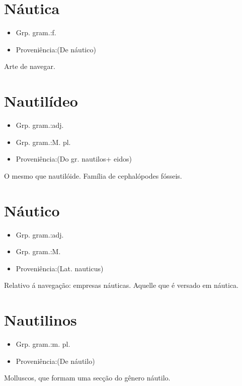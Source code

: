 \section{Náutica}
\begin{itemize}
\item {Grp. gram.:f.}
\end{itemize}
\begin{itemize}
\item {Proveniência:(De \textunderscore náutico\textunderscore )}
\end{itemize}
Arte de navegar.
\section{Nautilídeo}
\begin{itemize}
\item {Grp. gram.:adj.}
\end{itemize}
\begin{itemize}
\item {Grp. gram.:M. pl.}
\end{itemize}
\begin{itemize}
\item {Proveniência:(Do gr. \textunderscore nautilos\textunderscore  + \textunderscore eidos\textunderscore )}
\end{itemize}
O mesmo que \textunderscore nautilóide\textunderscore .
Família de cephalópodes fósseis.
\section{Náutico}
\begin{itemize}
\item {Grp. gram.:adj.}
\end{itemize}
\begin{itemize}
\item {Grp. gram.:M.}
\end{itemize}
\begin{itemize}
\item {Proveniência:(Lat. \textunderscore nauticus\textunderscore )}
\end{itemize}
Relativo á navegação: \textunderscore empresas náuticas\textunderscore .
Aquelle que é versado em náutica.
\section{Nautilinos}
\begin{itemize}
\item {Grp. gram.:m. pl.}
\end{itemize}
\begin{itemize}
\item {Proveniência:(De \textunderscore náutilo\textunderscore )}
\end{itemize}
Molluscos, que formam uma secção do gênero náutilo.
